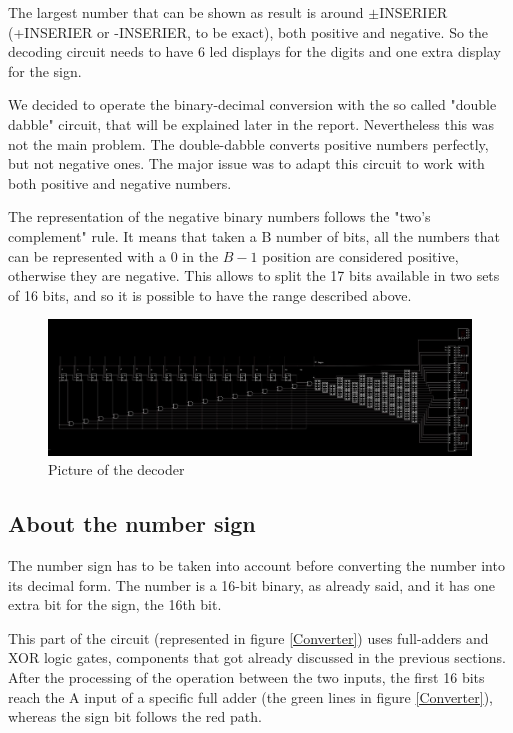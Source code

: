 \documentclass{article}
\begin{document}
\vspace{3mm}

The largest number that can be shown as result is around $\pm$INSERIER (+INSERIER or -INSERIER, to be exact), both positive and negative. So the decoding circuit needs to have 6 led displays for the digits and one extra display for the sign.

\vspace{3mm}

We decided to operate the binary-decimal conversion with the so called "double dabble" circuit, that will be explained later in the report. Nevertheless this was not the main problem. The double-dabble converts positive numbers perfectly, but not negative ones. The major issue was to adapt this circuit to work with both positive and negative numbers. 

The representation of the negative binary numbers follows the "two's complement" rule. It means that taken a B number of bits, all the numbers that can be represented with a 0 in the $B-1$ position are considered positive, otherwise they are negative. This allows to split the 17 bits available in two sets of 16 bits, and so it is possible to have the range described above.

\begin{figure}[h]
    \centering
    \includegraphics[scale=0.43]{SC_Decoder.JPG}
    \caption{Picture of the decoder}
    \label{Decoder}
  \end{figure}

\subsection{About the number sign}

The number sign has to be taken into account before converting the number into its decimal form. The number is a 16-bit binary, as already said, and it has one extra bit for the sign, the 16th bit.


This part of the circuit (represented in figure \ref{Converter}) uses full-adders and XOR logic gates, components that got already discussed in the previous sections. After the processing of the operation between the two inputs, the first 16 bits reach the A input of a specific full adder (the green lines in figure \ref{Converter}), whereas the sign bit follows the red path.
\end{document}
